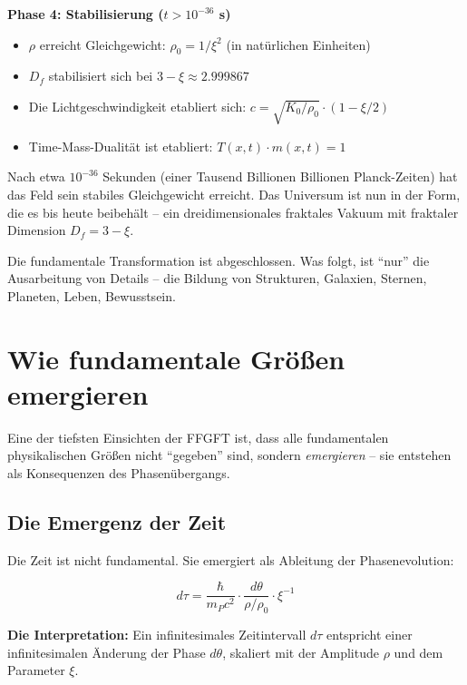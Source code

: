 	\textbf{Phase 4: Stabilisierung ($t > 10^{-36}$ s)}
	
	\begin{itemize}[leftmargin=*]
		\item $\rho$ erreicht Gleichgewicht: $\rho_0 = 1/\xi^2$ (in natürlichen Einheiten)
		\item $D_f$ stabilisiert sich bei $3 - \xi \approx 2.999867$
		\item Die Lichtgeschwindigkeit etabliert sich: $c = \sqrt{K_0/\rho_0} \cdot (1 - \xi/2)$
		\item Time-Mass-Dualität ist etabliert: $T(x,t) \cdot m(x,t) = 1$
	\end{itemize}
	
	Nach etwa $10^{-36}$ Sekunden (einer Tausend Billionen Billionen Planck-Zeiten) hat das Feld sein stabiles Gleichgewicht erreicht. Das Universum ist nun in der Form, die es bis heute beibehält -- ein dreidimensionales fraktales Vakuum mit fraktaler Dimension $D_f = 3 - \xi$.
	
	Die fundamentale Transformation ist abgeschlossen. Was folgt, ist \enquote{nur} die Ausarbeitung von Details -- die Bildung von Strukturen, Galaxien, Sternen, Planeten, Leben, Bewusstsein.
	
	\section{Wie fundamentale Größen emergieren}
	
	Eine der tiefsten Einsichten der FFGFT ist, dass alle fundamentalen physikalischen Größen nicht \enquote{gegeben} sind, sondern \textit{emergieren} -- sie entstehen als Konsequenzen des Phasenübergangs.
	
	\subsection{Die Emergenz der Zeit}
	
	Die Zeit ist nicht fundamental. Sie emergiert als Ableitung der Phasenevolution:
	
	\begin{equation}
		d\tau = \frac{\hbar}{m_P c^2} \cdot \frac{d\theta}{\rho/\rho_0} \cdot \xi^{-1}
	\end{equation}
	
	\textbf{Die Interpretation:} Ein infinitesimales Zeitintervall $d\tau$ entspricht einer infinitesimalen Änderung der Phase $d\theta$, skaliert mit der Amplitude $\rho$ und dem Parameter $\xi$.
	
